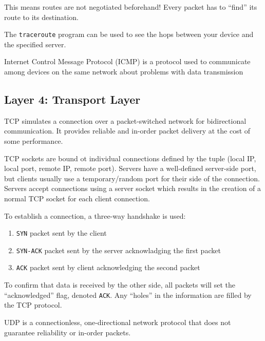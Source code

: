 This means routes are not negotiated beforehand! Every packet has to ``find'' its route to its destination.

\begin{notebox}
    The \texttt{traceroute} program can be used to see the hops between your device and the specified server.
\end{notebox}

\begin{dfnbox}{Internet Control Message Protocol (ICMP)}{}
     is a protocol used to communicate among devices on the same network about problems with data transmission
\end{dfnbox}

\subsection*{Layer 4: Transport Layer}

\begin{dfnbox}{TCP}{}
     simulates a connection over a packet-switched network for bidirectional communication. It provides reliable and in-order packet delivery at the cost of some performance.
\end{dfnbox}

TCP sockets are bound ot individual connections defined by the tuple (local IP, local port, remote IP, remote port). Servers have a well-defined server-side port, but clients usually use a temporary/random port for their side of the connection. Servers accept connections using a server socket which results in the creation of a normal TCP socket for each client connection.

To establish a connection, a three-way handshake is used:
\begin{enumerate}
    \item \texttt{SYN} packet sent by the client
    \item \texttt{SYN-ACK} packet sent by the server acknowladging the first packet
    \item \texttt{ACK} packet sent by client acknowledging the second packet
\end{enumerate}

To confirm that data is received by the other side, all packets will set the ``acknowledged'' flag, denoted \texttt{ACK}. Any ``holes'' in the information are filled by the TCP protocol.

\begin{dfnbox}{UDP}{}
     is a connectionless, one-directional network protocol that does not guarantee reliability or in-order packets.
\end{dfnbox}

